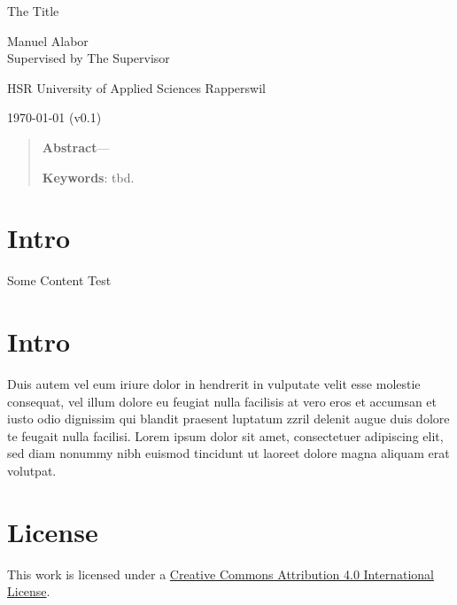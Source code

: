 \documentclass[12pt,a4paper]{article}
\newcommand{\version}{v0.1}
\begin{document}
\begin{centering}
	\Huge{The Title}
	\par
	\vspace{2ex}

	\normalsize{
		Manuel Alabor\\
		Supervised by The Supervisor\\
		\par
		\vspace{2ex}
		HSR University of Applied Sciences Rapperswil\\
		\par
		\vspace{2ex}
		\today{} (\version)
	}
	\par
	\vspace{2ex}

	\begin{quotation}
		\small{
			\noindent\textbf{Abstract}---
		}
		\par
		\vspace{2ex}

		\small{
			\noindent\textbf{Keywords}: tbd.
		}
		\par
		\vspace{4ex}
	\end{quotation}
\end{centering}

\section{Intro}
Some Content \cite{Author:Year:Abbr:1111111}
Test

\section{Intro}
Duis autem vel eum iriure dolor in hendrerit in vulputate velit esse molestie consequat, vel illum dolore eu feugiat nulla facilisis at vero eros et accumsan et iusto odio dignissim qui blandit praesent luptatum zzril delenit augue duis dolore te feugait nulla facilisi. Lorem ipsum dolor sit amet, consectetuer adipiscing elit, sed diam nonummy nibh euismod tincidunt ut laoreet dolore magna aliquam erat volutpat.




\section*{License}
\ccby\thinspace\thinspace This work is licensed under a \href{https://creativecommons.org/licenses/by/4.0/}{Creative Commons Attribution 4.0 International License}.
\end{document}
